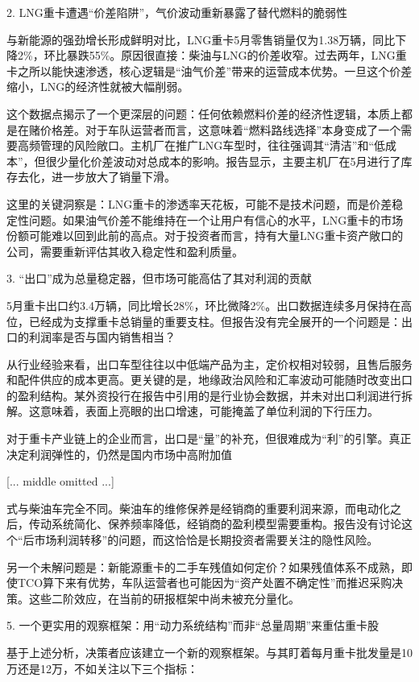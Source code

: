 \documentclass[11pt]{ctexart}
\begin{document}
2. LNG重卡遭遇“价差陷阱”，气价波动重新暴露了替代燃料的脆弱性

与新能源的强劲增长形成鲜明对比，LNG重卡5月零售销量仅为1.38万辆，同比下降2\%，环比暴跌55\%。原因很直接：柴油与LNG的价差收窄。过去两年，LNG重卡之所以能快速渗透，核心逻辑是“油气价差”带来的运营成本优势。一旦这个价差缩小，LNG的经济性就被大幅削弱。

这个数据点揭示了一个更深层的问题：任何依赖燃料价差的经济性逻辑，本质上都是在赌价格差。对于车队运营者而言，这意味着“燃料路线选择”本身变成了一个需要高频管理的风险敞口。主机厂在推广LNG车型时，往往强调其“清洁”和“低成本”，但很少量化价差波动对总成本的影响。报告显示，主要主机厂在5月进行了库存去化，进一步放大了销量下滑。

这里的关键洞察是：LNG重卡的渗透率天花板，可能不是技术问题，而是价差稳定性问题。如果油气价差不能维持在一个让用户有信心的水平，LNG重卡的市场份额可能难以回到此前的高点。对于投资者而言，持有大量LNG重卡资产敞口的公司，需要重新评估其收入稳定性和盈利质量。

3. “出口”成为总量稳定器，但市场可能高估了其对利润的贡献

5月重卡出口约3.4万辆，同比增长28\%，环比微降2\%。出口数据连续多月保持在高位，已经成为支撑重卡总销量的重要支柱。但报告没有完全展开的一个问题是：出口的利润率是否与国内销售相当？

从行业经验来看，出口车型往往以中低端产品为主，定价权相对较弱，且售后服务和配件供应的成本更高。更关键的是，地缘政治风险和汇率波动可能随时改变出口的盈利结构。某外资投行在报告中引用的是行业协会数据，并未对出口利润进行拆解。这意味着，表面上亮眼的出口增速，可能掩盖了单位利润的下行压力。

对于重卡产业链上的企业而言，出口是“量”的补充，但很难成为“利”的引擎。真正决定利润弹性的，仍然是国内市场中高附加值

[... middle omitted ...]

式与柴油车完全不同。柴油车的维修保养是经销商的重要利润来源，而电动化之后，传动系统简化、保养频率降低，经销商的盈利模型需要重构。报告没有讨论这个“后市场利润转移”的问题，而这恰恰是长期投资者需要关注的隐性风险。

另一个未解问题是：新能源重卡的二手车残值如何定价？如果残值体系不成熟，即使TCO算下来有优势，车队运营者也可能因为“资产处置不确定性”而推迟采购决策。这些二阶效应，在当前的研报框架中尚未被充分量化。

5. 一个更实用的观察框架：用“动力系统结构”而非“总量周期”来重估重卡股

基于上述分析，决策者应该建立一个新的观察框架。与其盯着每月重卡批发量是10万还是12万，不如关注以下三个指标：
\end{document}
